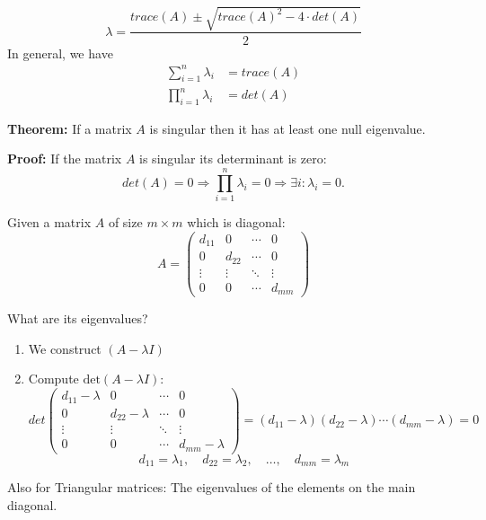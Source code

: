 $$ \lambda = \frac{trace(A) \pm \sqrt{trace(A)^2 - 4 \cdot det(A)}}{2} $$
In general, we have
\begin{align*}
    \sum_{i=1}^{n} \lambda_i &= trace(A) \\
    \prod_{i=1}^{n} \lambda_i &= det(A)
\end{align*}

\textbf{Theorem:}
If a matrix \( A \) is singular then it has at least one null eigenvalue.

\textbf{Proof:}
If the matrix \( A \) is singular its determinant is zero:
\[
    det(A) = 0 \Rightarrow \prod_{i=1}^{n} \lambda_i = 0 \Rightarrow \exists i: \lambda_i = 0.
\]

Given a matrix \( A \) of size \( m \times m \) which is diagonal:
\[
A = \begin{pmatrix}
d_{11} & 0 & \cdots & 0 \\
0 & d_{22} & \cdots & 0 \\
\vdots & \vdots & \ddots & \vdots \\
0 & 0 & \cdots & d_{mm}
\end{pmatrix}
\]

What are its eigenvalues?

\begin{enumerate}
    \item We construct \( (A - \lambda I) \)
    \item Compute \( \text{det}(A - \lambda I) \):
    \[
        det \begin{pmatrix}
        d_{11} - \lambda & 0 & \cdots & 0 \\
        0 & d_{22} - \lambda & \cdots & 0 \\
        \vdots & \vdots & \ddots & \vdots \\
        0 & 0 & \cdots & d_{mm} - \lambda
        \end{pmatrix} = (d_{11} - \lambda)(d_{22} - \lambda) \cdots (d_{mm} - \lambda) = 0
    \]
    \[
        d_{11} = \lambda_1, \quad d_{22} = \lambda_2, \quad \ldots, \quad d_{mm} = \lambda_m
    \]
\end{enumerate}
Also for Triangular matrices: The eigenvalues of the elements on the main diagonal.

